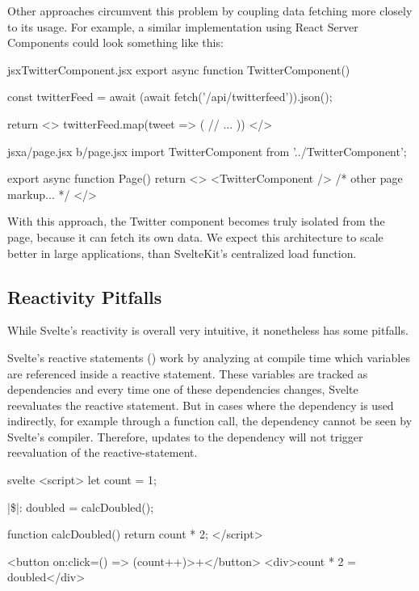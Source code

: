Other approaches circumvent this problem by coupling data fetching more closely to its usage. For example, a similar implementation using React Server Components could look something like this:

\begin{listing}[h!]
\begin{myminted}{jsx}{TwitterComponent.jsx}
export async function TwitterComponent() {
    const twitterFeed = await (await fetch('/api/twitterfeed')).json();

    return <>
        {twitterFeed.map(tweet => (
            // ...
        ))}
    </>
}
\end{myminted}
\begin{myminted}{jsx}{a/page.jsx b/page.jsx}
import TwitterComponent from '../TwitterComponent';

export async function Page() {
    return <>
        <TwitterComponent />
        { /* other page markup... */ }
    </>
}
\end{myminted}
\caption{Example of a reusable component using React server components.}
\label{fig:evaluation-reusable-rsc}
\end{listing}

With this approach, the Twitter component becomes truly isolated from the page, because it can fetch its own data. We expect this architecture to scale better in large applications, than SvelteKit's centralized load function.

\subsection{Reactivity Pitfalls}
\label{sec:evaluation-reactivity pitfalls}
While Svelte's reactivity is overall very intuitive, it nonetheless has some pitfalls.

Svelte's reactive statements () work by analyzing at compile time which variables are referenced inside a reactive statement. These variables are tracked as dependencies and every time one of these dependencies changes, Svelte reevaluates the reactive statement. But in cases where the dependency is used indirectly, for example through a function call, the dependency cannot be seen by Svelte's compiler. Therefore, updates to the dependency will not trigger reevaluation of the reactive-statement.

\begin{listing}[h!]
\begin{myminted}[escapeinside=||, autogobble]{svelte}{}
<script>
    let count = 1;

    |\$|: doubled = calcDoubled();

    function calcDoubled() {
        return count * 2;
    }
</script>

<button on:click={() => (count++)}>+</button>
<div>{count} * 2 = {doubled}</div>
\end{myminted}
\caption{\texttt{doubled} will not be recalculated when \texttt{count} changes.}
\label{fig:evaluation-reactivity-hidden-dependency}
\end{listing}

